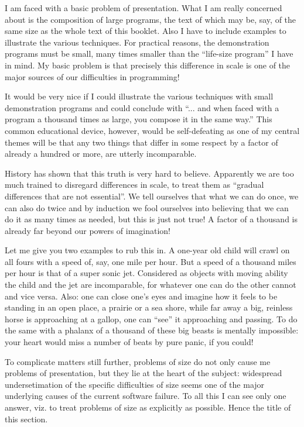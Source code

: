 I am faced with a basic problem of presentation. What I am really 
concerned about is the composition of large programs, the text of 
which may be, say, of the same size as the whole text of this 
booklet. Also I have to include examples to illustrate the various
techniques. For practical reasons, the demonstration programs 
must be small, many times smaller than the ``life-size program''
I have in mind. My basic problem is that precisely this difference 
in scale is one of the major sources of our difficulties in 
programming!

It would be very nice if I could illustrate the various techniques 
with small demonstration programs and could conclude with ``... 
and when faced with a program a thousand times as large, you 
compose it in the same way.'' This common educational device, 
however, would be self-defeating as one of my central themes will 
be that any two things that differ in some respect by a factor 
of already a hundred or more, are utterly incomparable.

History has shown that this truth is very hard to believe. 
Apparently we are too much trained to disregard differences in 
scale, to treat them as ``gradual differences that are not 
essential''. We tell ourselves that what we can do once, we can 
also do twice and by induction we fool ourselves into believing 
that we can do it as many times as needed, but this is just not 
true! A factor of a thousand is already far beyond our powers of
imagination!

Let me give you two examples to rub this in. A one-year old child
will crawl on all fours with a speed of, say, one mile per hour. 
But a speed of a thousand miles per hour is that of a super sonic 
jet. Considered as objects with moving ability the child and the 
jet are incomparable, for whatever one can do the other cannot and 
vice versa. Also: one can close one's eyes and imagine how it feels 
to be standing in an open place, a prairie or a sea shore, while 
far away a big, reinless horse is approaching at a gallop, one can
``see'' it approaching and passing. To do the same with a phalanx 
of a thousand of these big beasts is mentally impossible: your 
heart would miss a number of beats by pure panic, if you could!

To complicate matters still further, problems of size do not only 
cause me problems of presentation, but they lie at the heart of the 
subject: widespread undersetimation of the specific difficulties 
of size seems one of the major underlying causes of the current 
software failure. To all this I can see only one answer, viz. to 
treat problems of size as explicitly as possible. Hence the title 
of this section.

